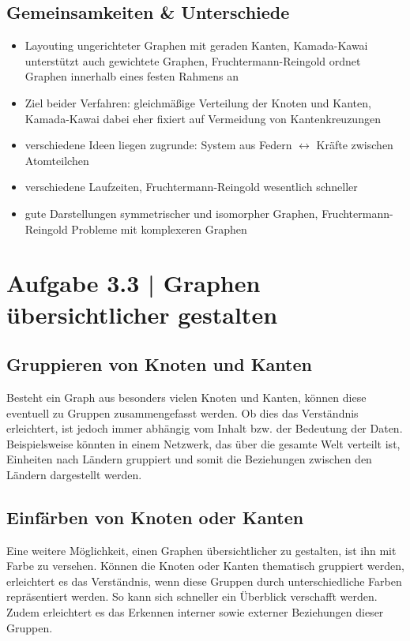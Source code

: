 \documentclass[a4paper,12pt,ngerman]{scrartcl}
\begin{document}
\subsection*{Gemeinsamkeiten \& Unterschiede}
\begin{itemize}
\item Layouting ungerichteter Graphen mit geraden Kanten, Kamada-Kawai unterstützt auch gewichtete Graphen, Fruchtermann-Reingold ordnet Graphen innerhalb eines festen Rahmens an
\item Ziel beider Verfahren: gleichmäßige Verteilung der Knoten und Kanten, Kamada-Kawai dabei eher fixiert auf Vermeidung von Kantenkreuzungen
\item verschiedene Ideen liegen zugrunde: System aus Federn $\leftrightarrow$ Kräfte zwischen Atomteilchen
\item verschiedene Laufzeiten, Fruchtermann-Reingold wesentlich schneller
\item gute Darstellungen symmetrischer und isomorpher Graphen, Fruchtermann-Reingold Probleme mit komplexeren Graphen
\end{itemize}

\section{Aufgabe 3.3 | Graphen übersichtlicher gestalten}

\subsection*{Gruppieren von Knoten und Kanten}
Besteht ein Graph aus besonders vielen Knoten und Kanten, können diese eventuell zu Gruppen zusammengefasst werden. Ob dies das Verständnis erleichtert, ist jedoch immer abhängig vom Inhalt bzw. der Bedeutung der Daten. Beispielsweise könnten in einem Netzwerk, das über die gesamte Welt verteilt ist, Einheiten nach Ländern gruppiert  und somit die Beziehungen zwischen den Ländern dargestellt werden.

\subsection*{Einfärben von Knoten oder Kanten}
Eine weitere Möglichkeit, einen Graphen übersichtlicher zu gestalten, ist ihn mit Farbe zu versehen. Können die Knoten oder Kanten thematisch gruppiert werden, erleichtert es das Verständnis, wenn diese Gruppen durch unterschiedliche Farben repräsentiert werden. So kann sich schneller ein Überblick verschafft werden. Zudem erleichtert es das Erkennen interner sowie externer Beziehungen dieser Gruppen.
\end{document}
